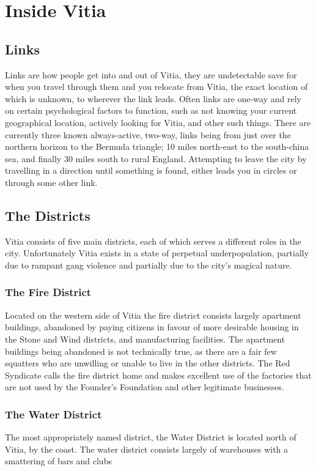 \documentclass{article}
\begin{document}
\section{Inside Vitia}
\begin{multicols}{2}
\subsection{Links}
Links are how people get into and out of Vitia, they are undetectable save for when you travel through them and you relocate from Vitia, the exact location of which is unknown, to wherever the link leads. Often links are one-way and rely on certain psychological factors to function, such as not knowing your current geographical location, actively looking for Vitia, and other such things. 
There are currently three known always-active, two-way, links being from just over the northern horizon to the Bermuda triangle; 10 miles north-east to the south-china sea, and finally 30 miles south to rural England. Attempting to leave the city by travelling in a direction until something is found, either leads you in circles or through some other link.
\subsection{The Districts}
Vitia consists of five main districts, each of which serves a different roles in the city. Unfortunately Vitia exists in a state of perpetual underpopulation, partially due to rampant gang violence and partially due to the city's magical nature.
\subsubsection{The Fire District}
Located on the western side of Vitia the fire district consists largely apartment buildings, abandoned by paying citizens in favour of more desirable housing in the Stone and Wind districts, and manufacturing facilities. The apartment buildings being abandoned is not technically true, as there are a fair few squatters who are unwilling or unable to live in the other districts. The Red Syndicate calls the fire district home and makes excellent use of the factories that are not used by the Founder's Foundation and other legitimate businesses.
\subsubsection{The Water District}
The most appropriately named district, the Water District is located north of Vitia, by the coast. The water district consists largely of warehouses with a smattering of bars and clubs

\end{multicols}
\end{document}
